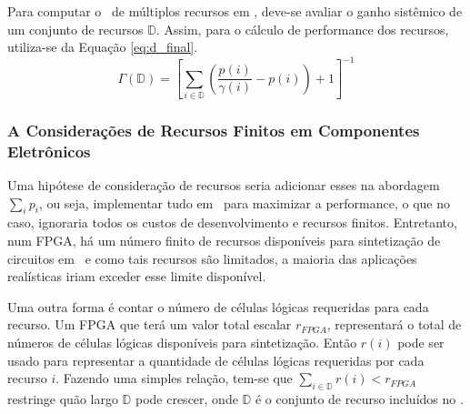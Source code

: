 
      Para computar o \speedup\ de múltiplos recursos em \hardware, deve-se avaliar o ganho sistêmico de um conjunto de recursos $ \mathbb{D} $.
      Assim, para o cálculo de performance dos recursos, utiliza-se da Equação \ref{eq:d_final}.
      \begin{equation}
         \Gamma (\mathbb{D}) =
         \left [
         \sum _{i \in \mathbb{D}} \left (
         \frac{
            p(i)
         }{
            \gamma(i)
         }-p(i)
         \right) + 1
         \right ]^{-1} \label{eq:d_final}
      \end{equation}

      \subsubsection{A Considerações de Recursos Finitos em Componentes Eletrônicos} \label{sec:recursos}

         Uma hipótese de consideração de recursos seria adicionar esses na abordagem $\sum_i p_i$, ou seja, implementar tudo em \hardware\ para maximizar a performance, o que no caso, ignoraria todos os custos de desenvolvimento e recursos finitos.
         Entretanto, num FPGA, há um número finito de recursos disponíveis para sintetização de circuitos em \hardware\ e como tais recursos são limitados, a maioria das aplicações realísticas iriam exceder esse limite disponível. 

         Uma outra forma é contar o número de células lógicas requeridas para cada recurso.
         Um FPGA que terá um valor total escalar $ r_{FPGA} $, representará o total de números de células lógicas disponíveis para sintetização.
         Então $ r(i) $ pode ser usado para representar a quantidade de células lógicas requeridas por cada recurso $ i $.
         Fazendo uma simples relação, tem-se que $ \sum_{i \in \mathbb{D}} r(i) < r_{FPGA} $ restringe quão largo $ \mathbb{D} $ pode crescer, onde $ \mathbb{D} $ é o conjunto de recurso incluídos no \design.

